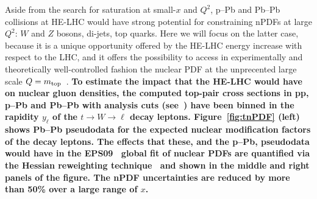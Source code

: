 \documentclass[../report.tex]{subfiles}
\begin{document}





Aside from the search for saturation at small-$x$ and $Q^2$, 
p--Pb and Pb--Pb collisions at HE-LHC would have strong potential for 
constraining nPDFs at large $Q^2$:
$W$ and $Z$ bosons, di-jets, top quarks. Here we will focus on the latter case, because it is a unique 
opportunity offered by the HE-LHC energy increase with respect to the LHC, and it offers 
the possibility to access in experimentally and theoretically well-controlled fashion the 
nuclear PDF at the unprecented large scale $Q=m_{\rm top}$~\cite{dEnterria:2015mgr,dEnterria:2017jyt}. 
{\bf To estimate the impact that the HE-LHC would have on nuclear gluon densities, the computed top-pair cross sections in
pp, p--Pb and Pb--Pb with analysis cuts (see~\cite{Dainese:2016gch}) have been binned in the rapidity $y_\ell$ of the $t\to W\to \ell$ decay leptons. 
Figure~\ref{fig:tnPDF} (left) shows Pb--Pb pseudodata for the expected nuclear modification
factors of the decay leptons. 
The effects that these, and the p--Pb, pseudodata would have in the EPS09~\cite{Eskola:2009uj} 
global fit of  nuclear PDFs are quantified via the
Hessian reweighting technique~\cite{Paukkunen:2014zia} and shown in the middle and right panels of the figure. The nPDF uncertainties are reduced by more than
50\% over a large range of $x$.}
\end{document}
